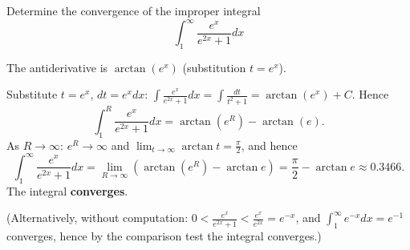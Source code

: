 
\begin{question}
Determine the convergence of the improper integral
\[ \int_1^\infty\frac{e^x}{e^{2x}+1}dx \]
\end{question}

\begin{hint}
The antiderivative is $\arctan(e^x)$ (substitution $t=e^x$).
\end{hint}

\begin{solution}
Substitute $t=e^x$, $dt=e^xdx$: $\int\frac{e^x}{e^{2x}+1}dx=\int\frac{dt}{t^2+1}=\arctan(e^x)+C$. Hence
\[ \int_1^R\frac{e^x}{e^{2x}+1}dx=\arctan(e^R)-\arctan(e). \]
As $R\to\infty$: $e^R\to\infty$ and $\lim_{t\to\infty}\arctan t=\frac\pi2$, and hence
\[ \int_1^\infty\frac{e^x}{e^{2x}+1}dx=\lim_{R\to\infty}\left(\arctan(e^R)-\arctan e\right)=\boxed{\frac\pi2-\arctan e}\approx0.3466. \]
The integral \textbf{converges}.

(Alternatively, without computation: $0<\frac{e^x}{e^{2x}+1}<\frac{e^x}{e^{2x}}=e^{-x}$, and $\int_1^\infty e^{-x}dx=e^{-1}$ converges, hence by the comparison test the integral converges.)
\end{solution}
